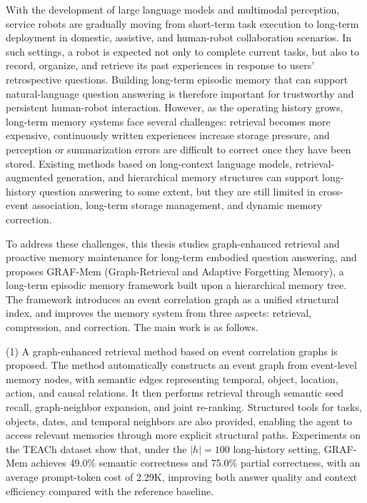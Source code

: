 \begin{engabstract}
With the development of large language models and multimodal perception, service robots are gradually moving from short-term task execution to long-term deployment in domestic, assistive, and human-robot collaboration scenarios. In such settings, a robot is expected not only to complete current tasks, but also to record, organize, and retrieve its past experiences in response to users' retrospective questions. Building long-term episodic memory that can support natural-language question answering is therefore important for trustworthy and persistent human-robot interaction. However, as the operating history grows, long-term memory systems face several challenges: retrieval becomes more expensive, continuously written experiences increase storage pressure, and perception or summarization errors are difficult to correct once they have been stored. Existing methods based on long-context language models, retrieval-augmented generation, and hierarchical memory structures can support long-history question answering to some extent, but they are still limited in cross-event association, long-term storage management, and dynamic memory correction.

To address these challenges, this thesis studies graph-enhanced retrieval and proactive memory maintenance for long-term embodied question answering, and proposes GRAF-Mem (Graph-Retrieval and Adaptive Forgetting Memory), a long-term episodic memory framework built upon a hierarchical memory tree. The framework introduces an event correlation graph as a unified structural index, and improves the memory system from three aspects: retrieval, compression, and correction. The main work is as follows.

(1) A graph-enhanced retrieval method based on event correlation graphs is proposed. The method automatically constructs an event graph from event-level memory nodes, with semantic edges representing temporal, object, location, action, and causal relations. It then performs retrieval through semantic seed recall, graph-neighbor expansion, and joint re-ranking. Structured tools for tasks, objects, dates, and temporal neighbors are also provided, enabling the agent to access relevant memories through more explicit structural paths. Experiments on the TEACh dataset show that, under the $|h|=100$ long-history setting, GRAF-Mem achieves 49.0\% semantic correctness and 75.0\% partial correctness, with an average prompt-token cost of 2.29K, improving both answer quality and context efficiency compared with the reference baseline.


\end{engabstract}
